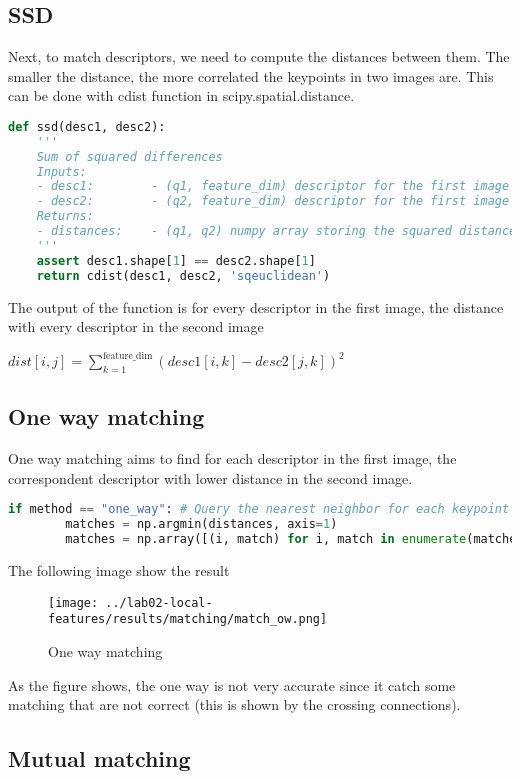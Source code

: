 \documentclass{ETHExercise}
\begin{document}
\subsection{SSD}
Next, to match descriptors, we need to compute the distances between them.
The smaller the distance, the more correlated the keypoints in two images are.
This can be done with cdist function in scipy.spatial.distance. 
\begin{lstlisting}[language=Python, caption=SSD]
def ssd(desc1, desc2):
    '''
    Sum of squared differences
    Inputs:
    - desc1:        - (q1, feature_dim) descriptor for the first image
    - desc2:        - (q2, feature_dim) descriptor for the first image
    Returns:
    - distances:    - (q1, q2) numpy array storing the squared distance
    '''
    assert desc1.shape[1] == desc2.shape[1]
    return cdist(desc1, desc2, 'sqeuclidean')
  \end{lstlisting}

  The output of the function is for every descriptor in the first image,
  the distance with every descriptor in the second image
  \begin{center}
    $dist[i,j] = \sum\limits_{k = 1}^{\text{feature\_dim}} (desc1[i, k] - desc2[j, k])^2$
  \end{center}

\subsection{One way matching}
One way matching aims to find for each descriptor in the first image, the correspondent 
descriptor with lower distance in the second image.

\begin{lstlisting}[language=Python, caption=One way matching]
  if method == "one_way": # Query the nearest neighbor for each keypoint in image 1
        matches = np.argmin(distances, axis=1)
        matches = np.array([(i, match) for i, match in enumerate(matches)])
\end{lstlisting}

The following image show the result

\begin{figure}[h]
  \centering
  \texttt{[image: ../lab02-local-features/results/matching/match\_ow.png]}
  \caption{One way matching}
\end{figure}

As the figure shows, the one way is not very accurate since it 
catch some matching that are not correct (this is shown by the crossing connections).

\subsection{Mutual matching}

  
\end{document}
